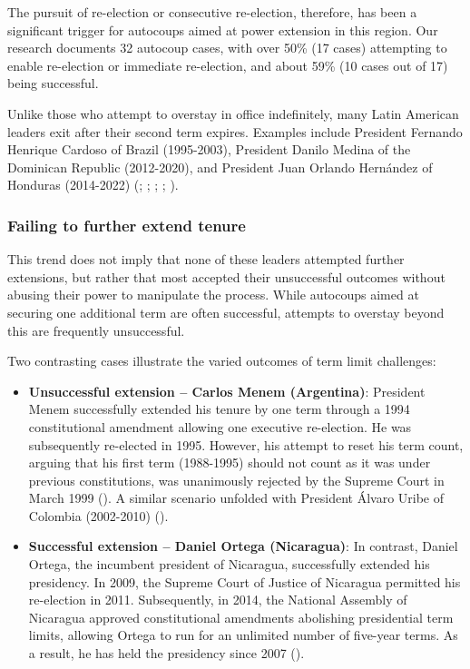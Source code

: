 \documentclass[
  12pt,
]{report}
\begin{document}
The pursuit of re-election or consecutive re-election, therefore, has
been a significant trigger for autocoups aimed at power extension in
this region. Our research documents 32 autocoup cases, with over 50\%
(17 cases) attempting to enable re-election or immediate re-election,
and about 59\% (10 cases out of 17) being successful.

Unlike those who attempt to overstay in office indefinitely, many Latin
American leaders exit after their second term expires. Examples include
President Fernando Henrique Cardoso of Brazil (1995-2003), President
Danilo Medina of the Dominican Republic (2012-2020), and President Juan
Orlando Hernández of Honduras (2014-2022)
(;
;
;
; ).

\subsubsection*{Failing to further extend
tenure}\label{failing-to-further-extend-tenure}

This trend does not imply that none of these leaders attempted further
extensions, but rather that most accepted their unsuccessful outcomes
without abusing their power to manipulate the process. While autocoups
aimed at securing one additional term are often successful, attempts to
overstay beyond this are frequently unsuccessful.

Two contrasting cases illustrate the varied outcomes of term limit
challenges:

\begin{itemize}
\item
  \textbf{Unsuccessful extension -- Carlos Menem (Argentina)}: President
  Menem successfully extended his tenure by one term through a 1994
  constitutional amendment allowing one executive re-election. He was
  subsequently re-elected in 1995. However, his attempt to reset his
  term count, arguing that his first term (1988-1995) should not count
  as it was under previous constitutions, was unanimously rejected by
  the Supreme Court in March 1999 (). A similar scenario unfolded with President Álvaro Uribe of
  Colombia (2002-2010) ().
\item
  \textbf{Successful extension -- Daniel Ortega (Nicaragua)}: In
  contrast, Daniel Ortega, the incumbent president of Nicaragua,
  successfully extended his presidency. In 2009, the Supreme Court of
  Justice of Nicaragua permitted his re-election in 2011. Subsequently,
  in 2014, the National Assembly of Nicaragua approved constitutional
  amendments abolishing presidential term limits, allowing Ortega to run
  for an unlimited number of five-year terms. As a result, he has held
  the presidency since 2007 ().
\end{itemize}
\end{document}
